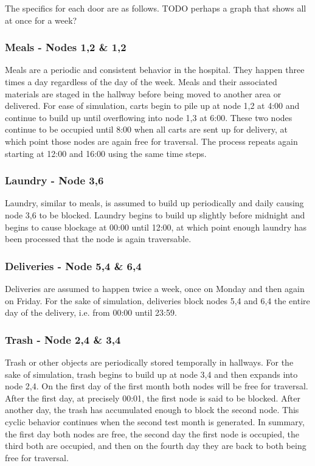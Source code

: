   The specifics for each door are as follows.
  TODO perhaps a graph that shows all at once for a week?

  \subsubsection{ Meals - Nodes 1,2 \& 1,2}

  Meals are a periodic and consistent behavior in the hospital. They happen
  three times a day regardless of the day of the week. Meals and their
  associated materials are staged in the hallway before being moved to
  another area or delivered. For ease of simulation, carts begin to pile up
  at node 1,2 at 4:00 and continue to build up until overflowing into node 1,3
  at 6:00. These two nodes continue to be occupied until 8:00 when all carts
  are sent up for delivery, at which point those nodes are again free for traversal. The
  process repeats again starting at 12:00 and 16:00 using the same time steps.

  \subsubsection{ Laundry - Node 3,6 }

  Laundry, similar to meals, is assumed to build up periodically and daily
  causing node 3,6 to be blocked. Laundry begins to build up slightly
  before midnight and begins to cause blockage at 00:00 until 12:00, at which
  point enough laundry has been processed that the node is again traversable.

  \subsubsection{ Deliveries - Node 5,4 \& 6,4 }

  Deliveries are assumed to happen twice a week, once on Monday and then again
  on Friday. For the sake of simulation, deliveries block nodes 5,4 and 6,4
  the entire day of the delivery, i.e. from 00:00 until 23:59.

  \subsubsection{ Trash - Node 2,4 \& 3,4 }

  Trash or other objects are periodically stored temporally in hallways.
  For the sake of simulation, trash begins to build up at node 3,4
  and then expands into node 2,4. On the first day of the first month both nodes
  will be free for traversal. After the first day, at precisely 00:01, the first
  node is said to be blocked. After another day, the trash has accumulated
  enough to block the second node. This cyclic behavior continues
  when the second test month is generated. In summary, the first day both nodes
  are free, the second day the first node is occupied, the third both are
  occupied, and then on the fourth day they are back to both being free for
  traversal.

